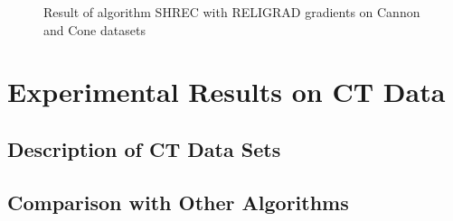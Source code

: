 \begin{figure}[tb]
	\caption{Result of algorithm SHREC with RELIGRAD gradients on Cannon and Cone datasets}
	\label{fig:cannon_cone}
\end{figure}
\section{Experimental Results on CT Data}

\subsection{Description of CT Data Sets}

\subsection{Comparison with Other Algorithms}
\label{section:comparison}

